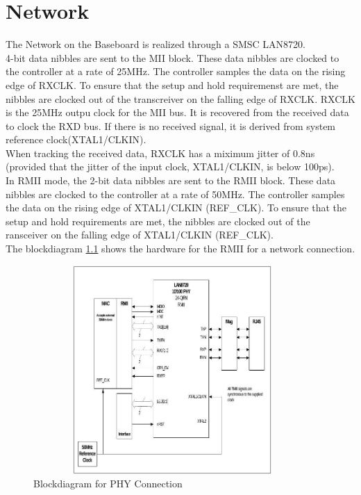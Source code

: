 \chapter{Network}
The Network on the Baseboard is realized through a SMSC LAN8720.\\
4-bit data nibbles are sent to the MII block. These data nibbles are clocked
to the controller at a rate of 25MHz. The controller samples the data on the
rising edge of RXCLK. To ensure that the setup and hold requiremenst are met,
the nibbles are clocked out of the transcreiver on the falling edge of RXCLK.
RXCLK is the 25MHz outpu clock for the MII bus. It is recovered from the received
data to clock the RXD bus. If there is no received signal, it is derived from
system reference clock(XTAL1/CLKIN).\\
When tracking the received data, RXCLK has a miximum jitter of 0.8ns (provided
that the jitter of the input clock, XTAL1/CLKIN, is below 100ps).\\
In RMII mode, the 2-bit data nibbles are sent to the RMII block. These data nibbles
are clocked to the controller at a rate of 50MHz. The controller samples the data
on the rising edge of XTAL1/CLKIN (REF\_CLK). To ensure that the setup and hold
requirements are met, the nibbles are clocked out of the ransceiver on the falling
edge of XTAL1/CLKIN (REF\_CLK).\\


The blockdiagram \ref{stm32f4_phy} shows the hardware for the RMII for
 a network connection.
\begin{figure}[ht]
	\centering
	\includegraphics[width=400px,height=300px]{../img/network.jpeg}
	\caption{Blockdiagram for PHY Connection}
	\label{stm32f4_phy}
\end{figure}

